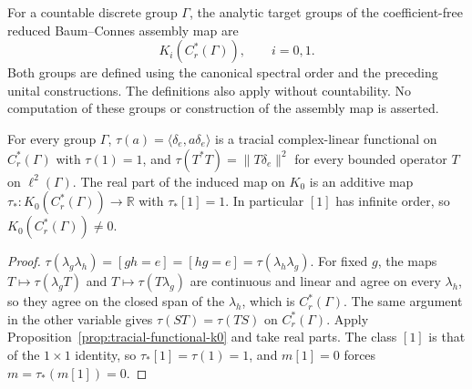 \begin{definition}\label{def:analytic-side}
\leanok
For a countable discrete group $\Gamma$, the analytic target groups of the
coefficient-free reduced Baum--Connes assembly map are
\[
 K_i(C_r^*(\Gamma)),\qquad i=0,1.
\]
Both groups are defined using the canonical spectral order and the preceding
unital constructions. The definitions also apply without countability.
No computation of these groups or construction of the assembly map is asserted.
\end{definition}

\begin{proposition}\label{prop:reduced-group-trace}
\leanok
For every group $\Gamma$, $\tau(a)=\langle\delta_e,a\delta_e\rangle$ is a
tracial complex-linear functional on $C_r^*(\Gamma)$ with $\tau(1)=1$, and
$\tau(T^*T)=\|T\delta_e\|^2$ for every bounded operator $T$ on
$\ell^2(\Gamma)$. The real part of the induced map on $K_0$ is an additive map
$\tau_*:K_0(C_r^*(\Gamma))\to\mathbb R$ with $\tau_*[1]=1$. In particular $[1]$
has infinite order, so $K_0(C_r^*(\Gamma))\neq0$.
\end{proposition}
\begin{proof}
\leanok
$\tau(\lambda_g\lambda_h)=[gh=e]=[hg=e]=\tau(\lambda_h\lambda_g)$. For fixed $g$,
the maps $T\mapsto\tau(\lambda_gT)$ and $T\mapsto\tau(T\lambda_g)$ are continuous
and linear and agree on every $\lambda_h$, so they agree on the closed span of
the $\lambda_h$, which is $C_r^*(\Gamma)$. The same argument in the other
variable gives $\tau(ST)=\tau(TS)$ on $C_r^*(\Gamma)$. Apply
Proposition~\ref{prop:tracial-functional-k0} and take real parts. The class $[1]$
is that of the $1\times1$ identity, so $\tau_*[1]=\tau(1)=1$, and $m[1]=0$ forces
$m=\tau_*(m[1])=0$.
\end{proof}

